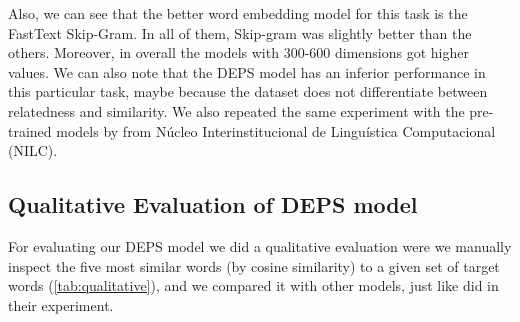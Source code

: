 Also, we can see that the better word embedding model for this task is the FastText Skip-Gram. In all of them, Skip-gram was slightly better than the others. Moreover, in overall the models with 300-600 dimensions got higher values. We can also note that the DEPS model has an inferior performance in this particular task, maybe because the dataset does not differentiate between relatedness and similarity.
We also repeated the same experiment with the pre-trained models by  from Núcleo Interinstitucional de Linguística Computacional (NILC).


\subsection{Qualitative Evaluation of DEPS model}\label{chap:results:qualitative}

For evaluating our DEPS model we did a qualitative evaluation were we manually inspect the five most similar words (by cosine similarity) to a given set of target words (\autoref{tab:qualitative}), and we compared it with other models, just like  did in their experiment.


